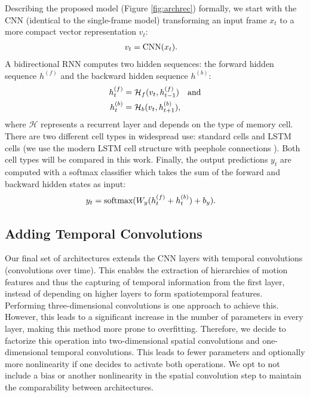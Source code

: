 \documentclass[11pt,a4paper]{article} \usepackage{a4wide}
\begin{document}
Describing the proposed model (Figure \ref{fig:archrec}) formally, we start with the CNN (identical to the single-frame model) transforming an input frame $x_t$ to a more compact vector representation $v_t$:
\begin{align}
v_t &= \textnormal{CNN}(x_t).
\end{align}
A bidirectional RNN computes two hidden sequences: the forward hidden sequence $h^{(f)}$ and the backward hidden sequence $h^{(b)}$:
\begin{align}
h_t^{(f)} &= \mathcal{H}_{f}(v_t, h_{t-1}^{(f)}) \quad \textnormal{and}\\
h_t^{(b)} &= \mathcal{H}_{b}(v_t, h_{t+1}^{(b)}),
\end{align}
where $\mathcal{H}$ represents a recurrent layer and depends on the type of memory cell. There are two different cell types in widespread use: standard cells and LSTM cells \citep{hochreiter1997long} (we use the modern LSTM cell structure with peephole connections \citep{gers2003learning}). Both cell types will be compared in this work.
Finally, the output predictions $y_t$ are computed with a softmax classifier which takes the sum of the forward and backward hidden states as input:
\begin{align}
y_t &= \textnormal{softmax}(W_{y}(h_{t}^{(f)}+h_{t}^{(b)})+b_y).
\end{align}





\subsection{Adding Temporal Convolutions} \label{sec:3d}



Our final set of architectures extends the CNN layers with temporal convolutions (convolutions over time). This enables the extraction of hierarchies of motion features and thus the capturing of temporal information from the first layer, instead of depending on higher layers to form spatiotemporal features. Performing three-dimensional convolutions is one approach to achieve this. However, this leads to a significant increase in the number of parameters in every layer, making this method more prone to overfitting. Therefore, we decide to factorize this operation into two-dimensional spatial convolutions and one-dimensional temporal convolutions. This leads to fewer parameters and optionally more nonlinearity if one decides to activate both operations. We opt to not include a bias or another nonlinearity in the spatial convolution step to maintain the comparability between architectures.
\end{document}
